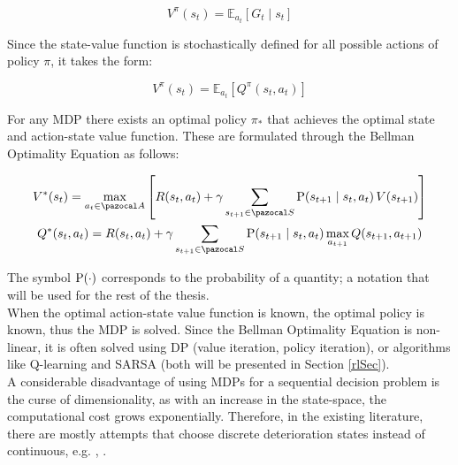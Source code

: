 \begin{equation}
    V^{\pi}(s_t)=\mathbb{E}_{a_t} \left[ G_{t} \mid s_t \right] 
\end{equation}

Since the state-value function is stochastically defined for all possible actions of policy $\pi$, it takes the form:

\begin{equation}
    V^{\pi}(s_t)=\mathbb{E}_{a_t}\left[Q^{\pi}(s_t, a_t)\right]
\end{equation}

\newpage

For any \gls{MDP} there exists an optimal policy $\pi_{*}$ that achieves the optimal state and action-state value function. These are formulated through the Bellman Optimality Equation as follows:

\begin{gather}
    V^*(s_t) = \max _{a_t\in\ccal{A}} \left[ R(s_t,a_t) + \gamma \sum _{s_{t+1}\in \ccal{S}} \prob{s_{t+1}\mid s_t, a_t} \, V(s_{t+1}) \right] \label{optimalV}\\
    Q^* (s_t,a_t) = R(s_t, a_t) + \gamma \sum_{s_{t+1}\in \ccal{S}} \prob{s_{t+1}\mid s_t, a_t}\, \underset{a_{t+1}}{\text{max}} \, Q(s_{t+1},a_{t+1})
\end{gather}

The symbol $\text{P}(\cdot)$ corresponds to the probability of a quantity; a notation that will be used for the rest of the thesis.\\

When the optimal action-state value function is known, the optimal policy is known, thus the \gls{MDP} is solved. Since the Bellman Optimality Equation is non-linear, it is often solved using \gls{DP} (value iteration, policy iteration), or algorithms like Q-learning and SARSA (both will be presented in Section \ref{rlSec}).\\

A considerable disadvantage of using \glspl{MDP} for a sequential decision problem is the curse of dimensionality, as with an increase in the state-space, the computational cost grows exponentially. Therefore, in the existing literature, there are mostly attempts that choose discrete deterioration states instead of continuous, e.g. \cite{andersen2021numerical}, \cite{compare2018markov}.




